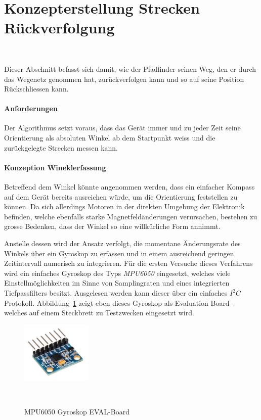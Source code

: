\documentclass[main.tex]{subfiles} %
\begin{document}

\section{Konzepterstellung Strecken Rückverfolgung}~\label{appendix:Strecke_Tracken}

Dieser Abschnitt befasst sich damit, wie der Pfadfinder seinen Weg, den er
durch das Wegenetz genommen hat, zurückverfolgen kann und so auf seine Position
Rückschliessen kann.

\paragraph{Anforderungen}
Der Algorithmus setzt voraus, dass das Gerät immer und zu jeder Zeit seine
Orientierung als absoluten Winkel ab dem Startpunkt weiss und die zurückgelegte
Strecken messen kann.

\paragraph{Konzeption Wineklerfassung}
Betreffend dem Winkel könnte angenommen werden, dass ein einfacher Kompass auf
dem Gerät bereits ausreichen würde, um die Orientierung feststellen zu können.
Da sich allerdings Motoren in der direkten Umgebung der Elektronik befinden,
welche ebenfalls starke Magnetfeldänderungen verursachen, bestehen zu grosse
Bedenken, dass der Winkel so eine willkürliche Form annimmt.

Anstelle dessen wird der Ansatz verfolgt, die momentane Änderungsrate des
Winkels über ein Gyroskop zu erfassen und in einem ausreichend geringen
Zeitintervall numerisch zu integrieren. Für die ersten Versuche dieses
Verfahrens wird ein einfaches Gyroskop des Typs \textit{MPU6050} eingesetzt,
welches viele Einstellmöglichkeiten im Sinne von Samplingraten und eines
integrierten Tiefpassfilters besitzt. Ausgelesen werden kann dieser über ein
einfaches $I^2C$ Protokoll. Abbildung~\ref{fig:MPU6050} zeigt eben dieses
Gyroskop als Evaluation Board - welches auf einem Steckbrett zu Testzwecken
eingesetzt wird.

\begin{figure}[h!]
    \centering
    \includegraphics[width=0.3\textwidth]{./fig_Strecken_Tracken/MPU6050.png}
    \caption{MPU6050 Gyroskop EVAL-Board}~\label{fig:MPU6050}
\end{figure}
\end{document}
